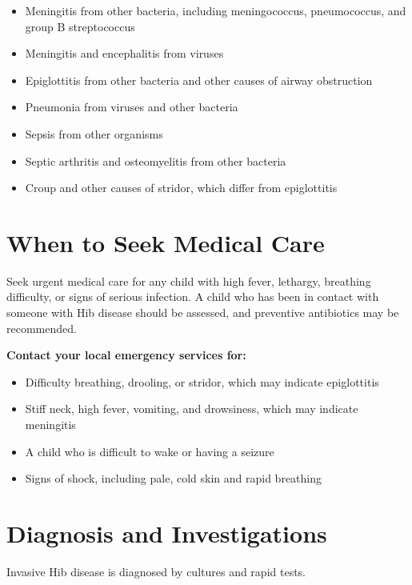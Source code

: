\begin{itemize}
    \item Meningitis from other bacteria, including meningococcus, pneumococcus, and group B streptococcus
    \item Meningitis and encephalitis from viruses
    \item Epiglottitis from other bacteria and other causes of airway obstruction
    \item Pneumonia from viruses and other bacteria
    \item Sepsis from other organisms
    \item Septic arthritis and osteomyelitis from other bacteria
    \item Croup and other causes of stridor, which differ from epiglottitis
\end{itemize}

\section*{When to Seek Medical Care}
Seek urgent medical care for any child with high fever, lethargy, breathing difficulty, or signs of serious infection. A child who has been in contact with someone with Hib disease should be assessed, and preventive antibiotics may be recommended.

\textbf{Contact your local emergency services for:}
\begin{itemize}
    \item Difficulty breathing, drooling, or stridor, which may indicate epiglottitis
    \item Stiff neck, high fever, vomiting, and drowsiness, which may indicate meningitis
    \item A child who is difficult to wake or having a seizure
    \item Signs of shock, including pale, cold skin and rapid breathing
\end{itemize}

\section*{Diagnosis and Investigations}
Invasive Hib disease is diagnosed by cultures and rapid tests.

